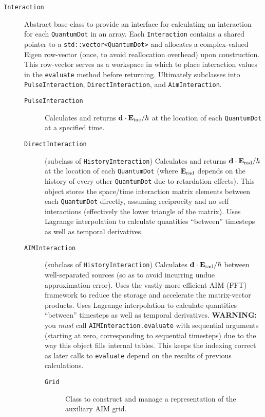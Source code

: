 \begin{description}
  \item[\texttt{Interaction}] Abstract base-class to provide an interface for calculating an interaction for each \lstinline!QuantumDot! in an array.
    Each \lstinline!Interaction! contains a shared pointer to a \lstinline!std::vector<QuantumDot>! and allocates a complex-valued Eigen row-vector (once, to avoid reallocation overhead) upon construction.
    This row-vector serves as a workspace in which to place interaction values in the \lstinline!evaluate! method before returning.
    Ultimately subclasses into \lstinline!PulseInteraction!, \lstinline!DirectInteraction!, and \lstinline!AimInteraction!.
    \begin{description}
      \item[\texttt{PulseInteraction}] Calculates and returns $\vb{d} \cdot \vb{E}_\text{inc}/\hbar$ at the location of each \lstinline!QuantumDot! at a specified time.
      \item[\texttt{DirectInteraction}] (subclass of \lstinline!HistoryInteraction!)
        Calculates and returns $\vb{d} \cdot \vb{E}_\text{rad}/\hbar$ at the location of each \lstinline!QuantumDot! (where $\vb{E}_\text{rad}$ depends on the history of every other \lstinline!QuantumDot! due to retardation effects).
        This object stores the space/time interaction matrix elements between each \lstinline!QuantumDot! directly, assuming reciprocity and no self interactions (effectively the lower triangle of the matrix).
        Uses Lagrange interpolation to calculate quantities ``between'' timesteps as well as temporal derivatives.
      \item[\texttt{AIMInteraction}] (subclass of \lstinline!HistoryInteraction!)
        Calculates $\vb{d} \cdot \vb{E}_\text{rad}/\hbar$ between well-separated sources (so as to avoid incurring undue approximation error).
        Uses the vastly more efficient AIM (FFT) framework to reduce the storage and accelerate the matrix-vector products.
        Uses Lagrange interpolation to calculate quantities ``between'' timesteps as well as temporal derivatives.
        \textcolor{Red!90!black}{\textbf{WARNING:}} you \emph{must} call \lstinline!AIMInteraction.evaluate! with sequential arguments (starting at zero, corresponding to sequential timesteps) due to the way this object fills internal tables.
        This keeps the indexing correct as later calls to \lstinline!evaluate! depend on the results of previous calculations.
        \begin{description}
          \item[\texttt{Grid}] Class to construct and manage a representation of the auxiliary AIM grid.

\end{description}
\end{description}
\end{description}
